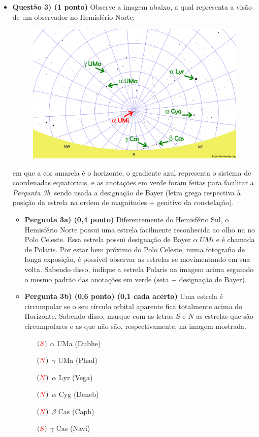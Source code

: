 \documentclass[a4paper, 12pt]{article}
\newcommand{\red}[1]{\textcolor{red}{#1}}
\begin{document}
\begin{flushleft}
\begin{itemize}
		\item \textbf{Questão 3) (1 ponto)} Observe a imagem abaixo, a qual representa a visão de um observador no Hemisfério Norte:
			\begin{figure}[H]
				\centering
				\includegraphics[scale=0.5]{./img/3.png}
			\end{figure}
			em que a cor amarela é o horizonte, o gradiente azul representa o sistema de coordenadas equatoriais, e as anotações em verde foram feitas para facilitar a \textit{Pergunta 3b}, sendo usada a designação de Bayer (letra grega respectiva à posição da estrela na ordem de magnitudes + genitivo da constelação).
			\begin{itemize}
				\item \textbf{Pergunta 3a) (0,4 ponto)} Diferentemente do Hemisfério Sul, o Hemisfério Norte possui uma estrela facilmente reconhecida ao olho nu no Polo Celeste. Essa estrela possui designação de Bayer $\alpha \; UMi$ e é chamada de Polaris. Por estar bem próximo do Polo Celeste, numa fotografia de longa exposição, é possível observar as estrelas se movimentando em sua volta. Sabendo disso, indique a estrela Polaris na imagem acima seguindo o mesmo padrão das anotações em verde (seta + designação de Bayer).
				\item \textbf{Pergunta 3b) (0,6 ponto) (0,1 cada acerto)} Uma estrela é circumpolar se o seu círculo orbital aparente fica totalmente acima do Horizonte. Sabendo disso, marque com as letras $S$ e $N$ as estrelas que são circumpolares e as que não são, respectivamente, na imagem mostrada.
					\begin{multicols}{3} \begin{itemize}
						\item[$(\red{S})$] $\alpha$ UMa (Dubhe)
						\item[$(\red{N})$] $\gamma$ UMa (Phad)
						\item[$(\red{N})$] $\alpha$ Lyr (Vega)
						\item[$(\red{N})$] $\alpha$ Cyg (Deneb)
						\item[$(\red{N})$] $\beta$ Cas (Caph)
						\item[$(\red{S})$] $\gamma$ Cas (Navi)
					\end{itemize} \end{multicols}
			\end{itemize}
			

\end{itemize}
\end{flushleft}
\end{document}
